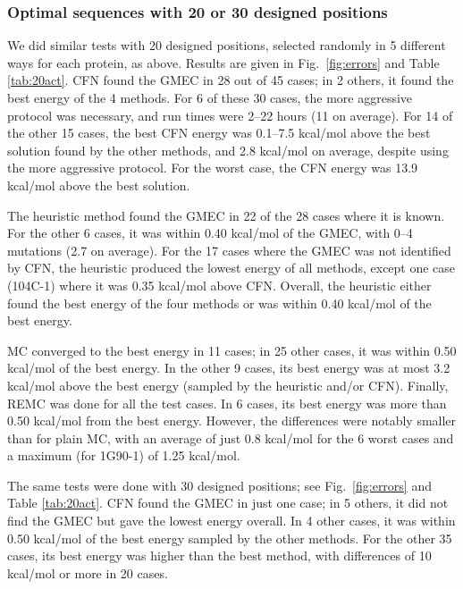 {{\subsubsection{Optimal sequences with 20 or 30 designed positions}
We did similar tests with 20 designed positions, selected randomly in 5 different ways for each protein, as above.
Results are given in Fig.\ \ref{fig:errors} and Table \ref{tab:20act}. CFN found the GMEC in 28 out of 45 cases;
in 2 others, it found the best energy of the 4 methods. For 6 of these 30 cases, the more aggressive protocol was
necessary, and run times were 2--22 hours (11 on average). For 14 of the other 15 cases, the best CFN energy was
0.1--7.5 kcal/mol above the best solution found by the other methods, and 2.8 kcal/mol on average, despite using the
more aggressive protocol. For the worst case, the CFN energy was 13.9 kcal/mol above the best solution.

The heuristic method found the GMEC in 22 of the 28 cases where it is known. For the other 6 cases, it was within 0.40
kcal/mol of the GMEC, with 0--4 mutations (2.7 on average). For the 17 cases where the GMEC was not identified by CFN,
the heuristic produced the lowest energy of all methods, except one case (104C-1) where it was 0.35 kcal/mol above CFN.
Overall, the heuristic either found the best energy of the four methods or was within 0.40 kcal/mol of the best energy.

MC converged to the best energy in 11 cases; in 25 other cases, it was within 0.50 kcal/mol of the best energy. In the
other 9 cases, its best energy was at most 3.2 kcal/mol above the best energy (sampled by the heuristic and/or CFN).
Finally, REMC was done for all the test cases. In 6 cases, its best energy was more than 0.50 kcal/mol from the best
energy. However, the differences were notably smaller than for plain MC, with an average of just 0.8 kcal/mol for the
6 worst cases and a maximum (for 1G90-1) of 1.25 kcal/mol.

The same tests were done with 30 designed positions; see Fig.\ \ref{fig:errors} and Table \ref{tab:20act}. CFN
found the GMEC in just one case; in 5 others, it did not find the GMEC but gave the lowest energy overall. In 4
other cases, it was within 0.50 kcal/mol of the best energy sampled by the other methods. For the other 35 cases,
its best energy was higher than the best method, with differences of 10 kcal/mol or more in 20 cases.


}}
